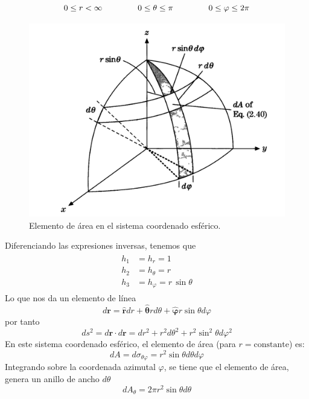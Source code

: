 \begin{align*}
0 \leq r < \infty \hspace{1.5cm} 0 \leq \theta \leq \pi \hspace{1.5cm} 0 \leq \varphi \leq 2 \pi
\end{align*}
\begin{figure}[H]
    \centering
    \includegraphics[scale=0.35]{Imagenes/Elemento_Area_Esferico}
    \caption{Elemento de área en el sistema coordenado esférico.}
    \label{fig:figura_elemento_area_esferico}
\end{figure}
Diferenciando las expresiones inversas, tenemos que 
\begin{align}
\begin{aligned}
h_{1} &= h_{r} = 1 \\
h_{2} &= h_{\theta} = r \\
h_{3} &= h_{\varphi} = r \, \sin \theta 
\end{aligned}
\label{eq:ecuacion_02_039}
\end{align}
Lo que nos da un elemento de línea
\[ d \mathbf{r} = \mathbf{\widehat{r}} dr + \bm{\widehat{\theta}} r d\theta + \bm{\widehat{\varphi}} r \sin \theta d \varphi \]
por tanto
\[ ds^{2} = d \mathbf{r} \cdot d \mathbf{r} =  dr^{2} + r^{2} d \theta^{2} + r^{2} \sin^{2} \theta d \varphi^{2} \]
En este sistema coordenado esférico, el elemento de área (para $r=\text{constante}$) es:
\[ dA = d\sigma_{\theta \varphi} = r^{2} \sin \theta d\theta d\varphi \]
Integrando sobre la coordenada azimutal $\varphi$, se tiene que el elemento de área, genera un anillo de ancho $d\theta$
\[ dA_{\theta} = 2 \pi r^{2} \sin \theta d \theta \]
